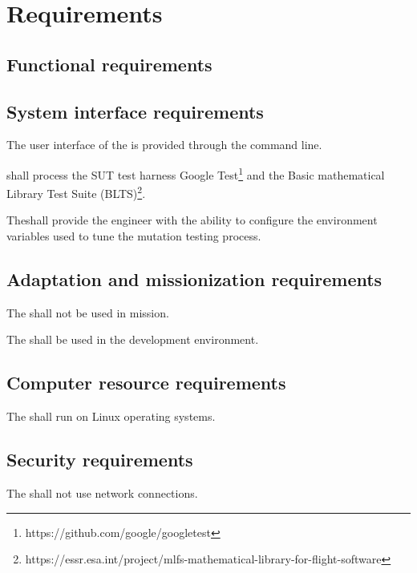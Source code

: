 \chapter{Requirements}

\section{Functional requirements}
\label{sec:requirements}






\section{System interface requirements}

\RQ{} The user interface of the \FAQAS is provided through the command line.

\RQ{} \FAQAS shall process the SUT test harness Google Test\footnote{https://github.com/google/googletest} and the Basic mathematical Library Test Suite (BLTS)\footnote{https://essr.esa.int/project/mlfs-mathematical-library-for-flight-software}.

\RQ{} The\FAQAS shall provide the engineer with the ability to configure the environment variables used to tune the mutation testing process.



\section{Adaptation and missionization requirements}

\RQ{} The \FAQAS shall not be used in mission.

\RQ{} The \FAQAS shall be used in the development environment. 




\section{Computer resource requirements}


\RQ{} The \FAQAS shall run on Linux operating systems.



\section{Security requirements }

\RQ{} The \FAQAS shall not use network connections.

